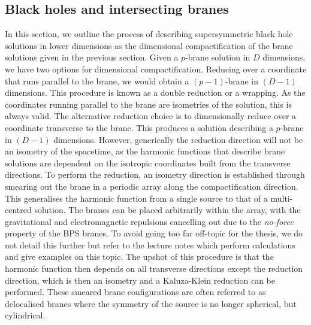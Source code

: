 \subsection{Black holes and intersecting branes}
\label{sec:intersecting}

In this section, we outline the process of describing supersymmetric black hole solutions in lower dimensions as the dimensional compactification of the brane solutions given in the previous section. Given a $p$-brane solution in $D$ dimensions, we have two options for dimensional compactification. Reducing over a coordinate that runs parallel to the brane, we would obtain a $(p-1)$-brane in $(D-1)$ dimensions. This procedure is known as a double reduction or a wrapping. As the coordinates running parallel to the brane are isometries of the solution, this is always valid. The alternative reduction choice is to dimensionally reduce over a coordinate transverse to the brane. This produces a solution describing a $p$-brane in $(D-1)$ dimensions. However, generically the reduction direction will not be an isometry of the spacetime, as the harmonic functions that describe brane solutions are dependent on the isotropic coordinates built from the transverse directions. To perform the reduction, an isometry direction is established through smearing out the brane in a periodic array along the compactification direction. This generalises the harmonic function from a single source to that of a multi-centred solution. The branes can be placed arbitrarily within the array, with the gravitational and electromagnetic repulsions cancelling out due to the \emph{no-force} property of the BPS branes. To avoid going too far off-topic for the thesis, we do not detail this further but refer to the lecture notes \cite{Mohaupt:2000gc} which perform calculations and give examples on this topic. The upshot of this procedure is that the harmonic function then depends on all transverse directions except the reduction direction, which is then an isometry and a Kaluza-Klein reduction can be performed. These smeared brane configurations are often referred to as delocalised branes where the symmetry of the source is no longer spherical, but cylindrical. 

